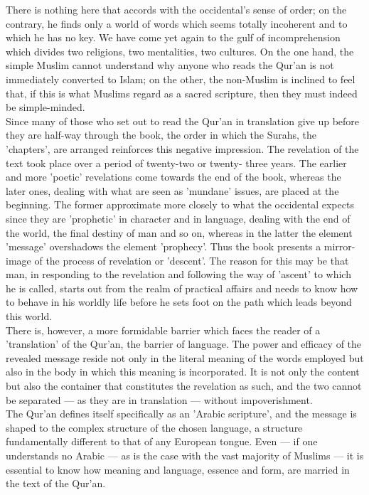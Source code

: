\documentclass[10pt, twoside]{book}
\begin{document}
There is nothing here that accords with the occidental's sense of order; on the contrary, he finds 
only a world of words which seems totally incoherent and to which he has no key. We have come yet 
again to the gulf of incomprehension which divides two religions, two mentalities, two cultures. On 
the one hand, the simple Muslim cannot understand why anyone who reads the Qur'an is not immediately 
converted to Islam; on the other, the non\hyp{}Muslim is inclined to feel that, if this is what Muslims 
regard as a sacred scripture, then they must indeed be simple\hyp{}minded. \\

Since many of those who set out to read the Qur'an in translation give up before they are half\hyp{}way 
through the book, the order in which the Surahs, the 'chapters', are arranged reinforces this 
negative impression. The revelation of the text took place over a period of twenty\hyp{}two or twenty\hyp{}
three years. The earlier and more 'poetic' revelations come towards the end of the book, whereas the 
later ones, dealing with what are seen as 'mundane' issues, are placed at the beginning. The former 
approximate more closely to what the occidental expects since they are 'prophetic' in character and 
in language, dealing with the end of the world, the final destiny of man and so on, whereas in the 
latter the element 'message' overshadows the element 'prophecy'. Thus the book presents a mirror\hyp{}
image of the process of revelation or 'descent'. The reason for this may be that man, in responding 
to the revelation and following the way of 'ascent' to which he is called, starts out from the realm 
of practical affairs and needs to know how to behave in his worldly life before he sets foot on the 
path which leads beyond this world. \\

There is, however, a more formidable barrier which faces the reader of a 'translation' of the Qur'an, 
the barrier of language. The power and efficacy of the revealed message reside not only in the 
literal meaning of the words employed but also in the body in which this meaning is incorporated. It 
is not only the content but also the container that constitutes the revelation as such, and the two 
cannot be separated --- as they are in translation --- without impoverishment. \\

The Qur'an defines itself specifically as an 'Arabic scripture', and the message is shaped to the 
complex structure of the chosen language, a structure fundamentally different to that of any European 
tongue. Even --- if one understands no Arabic --- as is the case with the vast majority of Muslims --- it 
is essential to know how meaning and language, essence and form, are married in the text of the 
Qur'an. \\
\end{document}
